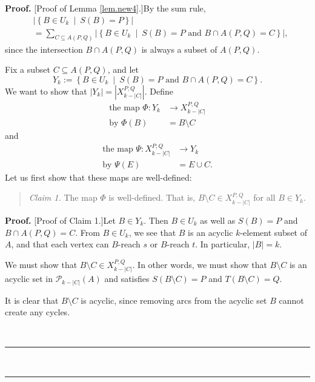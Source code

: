 \documentclass[numbers=enddot,12pt,final,onecolumn,notitlepage]{scrartcl}%
\theoremstyle{definition}
\newenvironment{statement}{\begin{quote}}{\end{quote}}
\newenvironment{proof}[1][Proof]{\noindent\textbf{#1.} }{\ \rule{0.5em}{0.5em}}
\let\sumnonlimits\sum
\renewcommand{\sum}{\sumnonlimits\limits}
\theoremstyle{plainsl}
\begin{document}
\begin{proof}
[Proof of Lemma \ref{lem.new4}.]By the sum rule,
\begin{align}
&  \left\vert \left\{  B\in U_{k}\ \mid\ S\left(  B\right)  =P\right\}
\right\vert \nonumber\\
&  =\sum_{C\subseteq A\left(  P,Q\right)  }\left\vert \left\{  B\in
U_{k}\ \mid\ S\left(  B\right)  =P\text{ and }B\cap A\left(  P,Q\right)
=C\right\}  \right\vert , \label{pf.lem.new4.sum}%
\end{align}
since the intersection $B\cap A\left(  P,Q\right)  $ is always a subset of
$A\left(  P,Q\right)  $.

Fix a subset $C\subseteq A(P,Q)$, and let
\[
Y_{k}:=\left\{  B\in U_{k}\ \mid\ S\left(  B\right)  =P\text{ and }B\cap
A\left(  P,Q\right)  =C\right\}  .
\]
We want to show that $\left\vert Y_{k}\right\vert =\left\vert X_{k-|C|}%
^{P,Q}\right\vert $. Define
\begin{align*}
\text{the map }\Phi:Y_{k}  &  \rightarrow X_{k-|C|}^{P,Q}\\
\text{by }\Phi(B)  &  =B\setminus C
\end{align*}
and
\begin{align*}
\text{the map }\Psi:X_{k-|C|}^{P,Q}  &  \rightarrow Y_{k}\\
\text{by }\Psi(E)  &  =E\cup C.
\end{align*}
Let us first show that these maps are well-defined:

\begin{statement}
\textit{Claim 1.} The map $\Phi$ is well-defined. That is, $B\setminus C\in
X_{k-|C|}^{P,Q}$ for all $B\in Y_{k}$.
\end{statement}

\begin{proof}
[Proof of Claim 1.]Let $B\in Y_{k}$. Then $B\in U_{k}$ as well as $S\left(
B\right)  =P$ and $B\cap A\left(  P,Q\right)  =C$. From $B\in U_{k}$, we see
that $B$ is an acyclic $k$-element subset of $A$, and that each vertex can
$B$-reach $s$ or $B$-reach $t$. In particular, $\left\vert B\right\vert =k$.

We must show that $B\setminus C\in X_{k-|C|}^{P,Q}$. In other words, we must
show that $B\setminus C$ is an acyclic set in $\mathcal{P}_{k-\left\vert
C\right\vert }\left(  A\right)  $ and satisfies $S\left(  B\setminus C\right)
=P$ and $T\left(  B\setminus C\right)  =Q$.

It is clear that $B\setminus C$ is acyclic, since removing arcs from the
acyclic set $B$ cannot create any cycles.


\end{proof}
\end{proof}
\end{document}

